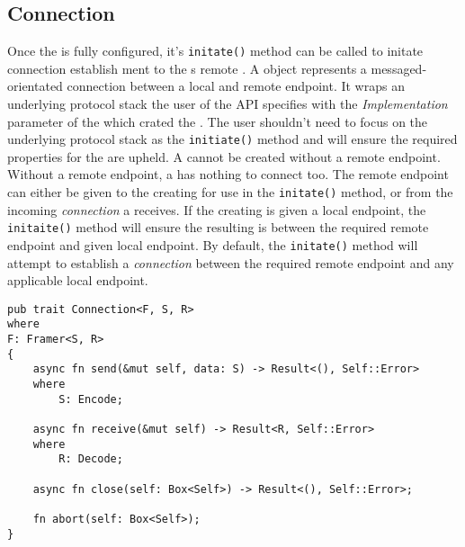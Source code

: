 \subsection{Connection}\label{subsec:connection}
Once the \preconnection{} is fully configured, it's \texttt{initate()} method can be called to initate connection
establish ment to the \preconnection{}s remote \Endpoint{}.
A \connection{} object represents a messaged-orientated connection between a local and remote endpoint.
It wraps an underlying protocol stack the user of the API specifies with the \emph{Implementation}
parameter of the \preconnection{} which crated the \connection{}.
The user shouldn't need to focus on the underlying protocol stack as the \texttt{initiate()} method and
\listener{} will ensure the required properties for the \connection{} are upheld.
A \connection{} cannot be created without a remote endpoint.
Without a remote endpoint, a \connection{} has nothing to connect too.
The remote endpoint can either be given to the creating \preconnection{} for use in the \texttt{initate()} method,
or from the incoming \emph{connection} a \listener{} receives.
If the creating \preconnection{} is given a local endpoint, the \texttt{initaite()} method will ensure the resulting
\connection{} is between the required remote endpoint and given local endpoint.
By default, the \texttt{initate()} method will attempt to establish a \emph{connection} between the required remote
endpoint and any applicable local endpoint.

\begin{lstlisting}[float=h, label=lst:connection, caption={The Connection trait.}]
pub trait Connection<F, S, R>
where
F: Framer<S, R>
{
    async fn send(&mut self, data: S) -> Result<(), Self::Error>
    where
        S: Encode;

    async fn receive(&mut self) -> Result<R, Self::Error>
    where
        R: Decode;

    async fn close(self: Box<Self>) -> Result<(), Self::Error>;

    fn abort(self: Box<Self>);
}
\end{lstlisting}

